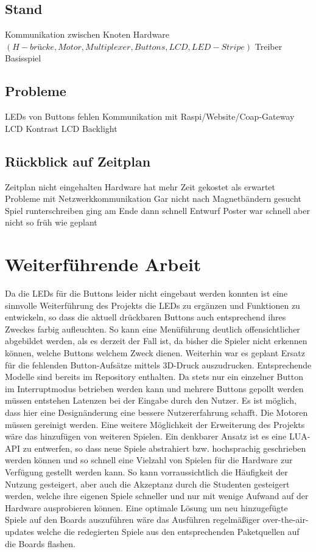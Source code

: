 \documentclass[a4paper]{article}
\begin{document}
\subsection{Stand}
Kommunikation zwischen Knoten
Hardware $(H-brücke, Motor, Multiplexer, Buttons, LCD, LED-Stripe )$
Treiber
Basisspiel
\subsection{Probleme}
LEDs von Buttons fehlen
Kommunikation mit Raspi/Website/Coap-Gateway
LCD Kontrast
LCD Backlight
\subsection{Rückblick auf Zeitplan}
Zeitplan nicht eingehalten
Hardware hat mehr Zeit gekostet als erwartet
Probleme mit Netzwerkkommunikation
Gar nicht nach Magnetbändern gesucht
Spiel runterschreiben ging am Ende dann schnell
Entwurf Poster war schnell aber nicht so früh wie geplant

\section{Weiterführende Arbeit}
\label{sec:further}
Da die LEDs für die Buttons leider nicht eingebaut werden konnten ist eine sinnvolle Weiterführung des Projekts die LEDs zu ergänzen und Funktionen zu entwickeln, so dass die aktuell drückbaren Buttons auch entsprechend ihres Zweckes farbig aufleuchten. So kann eine Menüführung deutlich offensichtlicher abgebildet werden, als es derzeit der Fall ist, da bisher die Spieler nicht erkennen können, welche Buttons welchem Zweck dienen.
Weiterhin war es geplant Ersatz für die fehlenden Button-Aufsätze mittels 3D-Druck auszudrucken. Entsprechende Modelle sind bereits im Repository enthalten.
Da stets nur ein einzelner Button im Interruptmodus betrieben werden kann und mehrere Buttons gepollt werden müssen entstehen Latenzen bei der Eingabe durch den Nutzer. Es ist möglich, dass hier eine Designänderung eine bessere Nutzererfahrung schafft.
Die Motoren müssen gereinigt werden.
Eine weitere Möglichkeit der Erweiterung des Projekts wäre das hinzufügen von weiteren Spielen. Ein denkbarer Ansatz ist es eine LUA-API zu entwerfen, so dass neue Spiele abstrahiert bzw. hochsprachig geschrieben werden können und so schnell eine Vielzahl von Spielen für die Hardware zur Verfügung gestellt werden kann. So kann vorraussichtlich die Häufigkeit der Nutzung gesteigert, aber auch die Akzeptanz durch die Studenten gesteigert werden, welche ihre eigenen Spiele schneller und nur mit wenige Aufwand auf der Hardware ausprobieren können.
Eine optimale Lösung um neu hinzugefügte Spiele auf den Boards auszuführen wäre das Ausführen regelmäßiger over-the-air-updates welche die redegierten Spiele aus den entsprechenden Paketquellen auf die Boards flashen.
\end{document}
